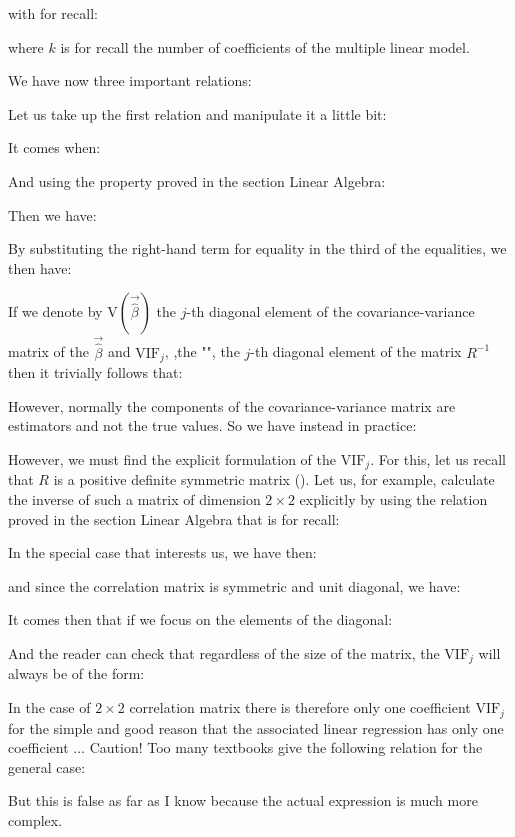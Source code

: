 	with for recall:
	
	where $k$ is for recall the number of coefficients of the multiple linear model.

	We have now three important relations:
	
	Let us take up the first relation and manipulate it a little bit:
	
	It comes when:
	
 	And using the property proved in the section Linear Algebra:
	
	Then we have:
	
	By substituting the right-hand term for equality in the third of the equalities, we then have:
	
	If we denote by $\text{V}\left(\vec{\hat{\beta}}\right)$ the $j$-th diagonal element of the covariance-variance matrix of the $\vec{\hat{\beta}}$ and $\text{VIF}_j$, ,the "", the $j$-th diagonal element of the matrix $R^{-1}$ then it trivially follows that:
	
	However, normally the components of the covariance-variance matrix are estimators and not the true values. So we have instead in practice:
	
	However, we must find the explicit formulation of the $\text{VIF}_j$. For this, let us recall that $R$ is a positive definite symmetric matrix (). Let us, for example, calculate the inverse of such a matrix of dimension $2\times 2$ explicitly by using the relation proved in the section Linear Algebra that is for recall:
	
	In the special case that interests us, we have then:
	
	and since the correlation matrix is symmetric and unit diagonal, we have:
	
	It comes then that if we focus on the elements of the diagonal:
	
	And the reader can check that regardless of the size of the matrix, the $\text{VIF}_j$ will always be of the form:
	
	In the case of $2\times 2$ correlation matrix there is therefore only one coefficient $\text{VIF}_j$ for the simple and good reason that the associated linear regression has only one coefficient ... Caution! Too many textbooks give the following relation for the general case:
	
	But this is false as far as I know because the actual expression is much more complex. 

